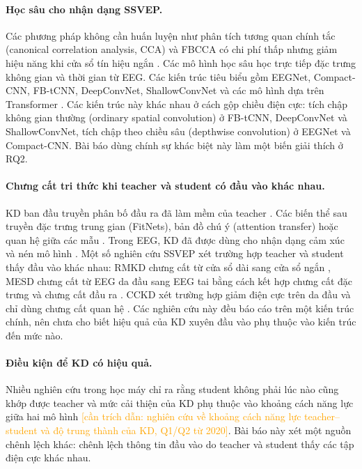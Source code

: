 \documentclass[10pt]{article} %
\newcommand{\cantrich}[1]{\textcolor{orange}{[cần trích dẫn: #1]}}
\begin{document}
\paragraph{Học sâu cho nhận dạng SSVEP.} Các phương pháp không cần huấn luyện như phân tích tương quan chính tắc (canonical correlation analysis, CCA) và FBCCA có chi phí thấp nhưng giảm hiệu năng khi cửa sổ tín hiệu ngắn \citep{lin2007cca,chen2015fbcca}. Các mô hình học sâu học trực tiếp đặc trưng không gian và thời gian từ EEG. Các kiến trúc tiêu biểu gồm EEGNet, Compact-CNN, FB-tCNN, DeepConvNet, ShallowConvNet và các mô hình dựa trên Transformer \citep{lawhern2018eegnet,waytowich2018compact,ding2021filterbank,schirrmeister2017deep,guney2023deep,chen2023transformer,wu2024analysis}. Các kiến trúc này khác nhau ở cách gộp chiều điện cực: tích chập không gian thường (ordinary spatial convolution) ở FB-tCNN, DeepConvNet và ShallowConvNet, tích chập theo chiều sâu (depthwise convolution) ở EEGNet và Compact-CNN. Bài báo dùng chính sự khác biệt này làm một biến giải thích ở RQ2.

\paragraph{Chưng cất tri thức khi teacher và student có đầu vào khác nhau.} KD ban đầu truyền phân bố đầu ra đã làm mềm của teacher \citep{hinton2015distilling}. Các biến thể sau truyền đặc trưng trung gian (FitNets), bản đồ chú ý (attention transfer) hoặc quan hệ giữa các mẫu \citep{romero2015fitnets,zagoruyko2017paying,tung2019spkd,gou2021survey,moslemi2024survey}. Trong EEG, KD đã được dùng cho nhận dạng cảm xúc và nén mô hình \citep{wang2024kdemotion}. Một số nghiên cứu SSVEP xét trường hợp teacher và student thấy đầu vào khác nhau: RMKD chưng cất từ cửa sổ dài sang cửa sổ ngắn \citep{lan2025rmkd}, MESD chưng cất từ EEG da đầu sang EEG tai bằng cách kết hợp chưng cất đặc trưng và chưng cất đầu ra \citep{sun2024mesd}. CCKD xét trường hợp giảm điện cực trên da đầu và chỉ dùng chưng cất quan hệ \citep{icera2026cckd}. Các nghiên cứu này đều báo cáo trên một kiến trúc chính, nên chưa cho biết hiệu quả của KD xuyên đầu vào phụ thuộc vào kiến trúc đến mức nào.

\paragraph{Điều kiện để KD có hiệu quả.} Nhiều nghiên cứu trong học máy chỉ ra rằng student không phải lúc nào cũng khớp được teacher và mức cải thiện của KD phụ thuộc vào khoảng cách năng lực giữa hai mô hình \cantrich{nghiên cứu về khoảng cách năng lực teacher--student và độ trung thành của KD, Q1/Q2 từ 2020}. Bài báo này xét một nguồn chênh lệch khác: chênh lệch thông tin đầu vào do teacher và student thấy các tập điện cực khác nhau.
\end{document}
